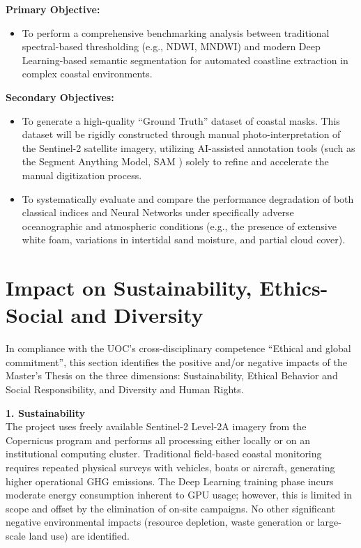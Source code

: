 ﻿\documentclass[ENG]{TFUOC}%
\begin{document}
\vspace{0.3cm}
\noindent\textbf{Primary Objective:}
\begin{itemize}
    \item To perform a comprehensive benchmarking analysis between traditional spectral-based thresholding (e.g., NDWI, MNDWI) and modern Deep Learning-based semantic segmentation for automated coastline extraction in complex coastal environments.
\end{itemize}

\noindent\textbf{Secondary Objectives:}
\begin{itemize}
    \item To generate a high-quality ``Ground Truth'' dataset of coastal masks. This dataset will be rigidly constructed through manual photo-interpretation of the Sentinel-2 satellite imagery, utilizing AI-assisted annotation tools (such as the Segment Anything Model, SAM \citep{kirillov_segment_2023}) solely to refine and accelerate the manual digitization process.
    \item To systematically evaluate and compare the performance degradation of both classical indices and Neural Networks under specifically adverse oceanographic and atmospheric conditions (e.g., the presence of extensive white foam, variations in intertidal sand moisture, and partial cloud cover).
\end{itemize}

\section{Impact on Sustainability, Ethics-Social and Diversity}
\label{s:etic}

In compliance with the UOC's cross-disciplinary competence ``Ethical and global commitment'', this section identifies the positive and/or negative impacts of the Master's Thesis on the three dimensions: Sustainability, Ethical Behavior and Social Responsibility, and Diversity and Human Rights.

\textbf{1. Sustainability} \\
The project uses freely available Sentinel-2 Level-2A imagery from the Copernicus program and performs all processing either locally or on an institutional computing cluster. Traditional field-based coastal monitoring requires repeated physical surveys with vehicles, boats or aircraft, generating higher operational GHG emissions. The Deep Learning training phase incurs moderate energy consumption inherent to GPU usage; however, this is limited in scope and offset by the elimination of on-site campaigns. No other significant negative environmental impacts (resource depletion, waste generation or large-scale land use) are identified.
\end{document}

